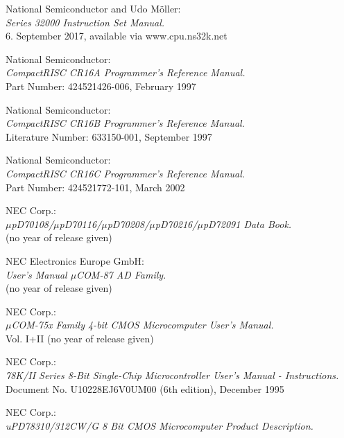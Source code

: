  National Semiconductor and Udo M\"oller: \\
                  {\em Series 32000 Instruction Set Manual.\/} \\
                  6. September 2017, available via www.cpu.ns32k.net

 National Semiconductor: \\
                  {\em CompactRISC CR16A Programmer's Reference Manual.} \\
                  Part Number: 424521426-006, February 1997

 National Semiconductor: \\
                  {\em CompactRISC CR16B Programmer's Reference Manual.} \\
                  Literature Number: 633150-001, September 1997

 National Semiconductor: \\
                  {\em CompactRISC CR16C Programmer's Reference Manual.} \\
                  Part Number: 424521772-101, March 2002

 NEC Corp.: \\
   	       {\em $\mu$pD70108/$\mu$pD70116/$\mu$pD70208/$\mu$pD70216/$\mu$pD72091 
               Data Book.\/} \\
               (no year of release given)

 NEC Electronics Europe GmbH: \\
                  {\em User's Manual $\mu$COM-87 AD Family.\/} \\
		  (no year of release given)

 NEC Corp.: \\
                {\em $\mu$COM-75x Family 4-bit CMOS Microcomputer User's
                 Manual.\/} \\
                Vol. I+II (no year of release given)

 NEC Corp.: \\
                {\em 78K/II Series 8-Bit Single-Chip Microcontroller
                 User's Manual - Instructions.\/} \\
                Document No. U10228EJ6V0UM00 (6th edition), December 1995

 NEC Corp.: \\
		{\em uPD78310/312CW/G 8 Bit CMOS Microcomputer Product
                 Description.\/}

